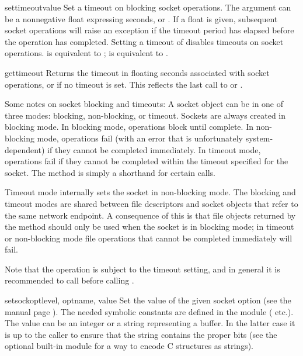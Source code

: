 \begin{methoddesc}[socket]{settimeout}{value}
Set a timeout on blocking socket operations.  The  argument
can be a nonnegative float expressing seconds, or .
If a float is
given, subsequent socket operations will raise an 
exception if the timeout period  has elapsed before the
operation has completed.  Setting a timeout of  disables
timeouts on socket operations.
 is equivalent to ;
 is equivalent to .
\end{methoddesc}

\begin{methoddesc}[socket]{gettimeout}{}
Returns the timeout in floating seconds associated with socket
operations, or  if no timeout is set.  This reflects
the last call to  or .
\end{methoddesc}

Some notes on socket blocking and timeouts: A socket object can be in
one of three modes: blocking, non-blocking, or timeout.  Sockets are
always created in blocking mode.  In blocking mode, operations block
until complete.  In non-blocking mode, operations fail (with an error
that is unfortunately system-dependent) if they cannot be completed
immediately.  In timeout mode, operations fail if they cannot be
completed within the timeout specified for the socket.  The
 method is simply a shorthand for certain
 calls.

Timeout mode internally sets the socket in non-blocking mode.  The
blocking and timeout modes are shared between file descriptors and
socket objects that refer to the same network endpoint.  A consequence
of this is that file objects returned by the 
method should only be used when the socket is in blocking mode; in
timeout or non-blocking mode file operations that cannot be completed
immediately will fail.

Note that the  operation is subject to the timeout
setting, and in general it is recommended to call
 before calling .

\begin{methoddesc}[socket]{setsockopt}{level, optname, value}
Set the value of the given socket option (see the \UNIX{} manual page
).  The needed symbolic constants are defined in
the  module ( etc.).  The value can be an
integer or a string representing a buffer.  In the latter case it is
up to the caller to ensure that the string contains the proper bits
(see the optional built-in module
 for a way to encode C
structures as strings). 
\end{methoddesc}


